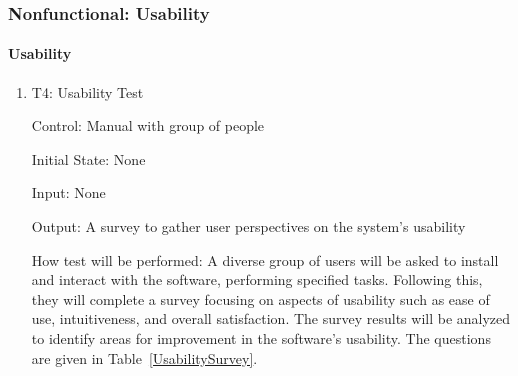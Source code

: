 \documentclass[12pt, titlepage]{article}
\begin{document}
\subsubsection{Nonfunctional: Usability} \label{NFUsability}
		
\paragraph{Usability}

\begin{enumerate}

  \item{T4: Usability Test\\}

  Control: Manual with group of people
  
  Initial State: None
  
  Input: None
  
  Output: A survey to gather user perspectives on the system's usability

  How test will be performed: A diverse group of users will be asked to install 
  and interact with the software, performing specified tasks. 
  Following this, they will complete a survey focusing on aspects of 
  usability such as ease of use, intuitiveness, and overall satisfaction. 
  The survey results will be analyzed to identify areas for improvement in the software's usability. 
  The questions are given in Table~\ref{UsabilitySurvey}.
\end{enumerate}
\end{document}
